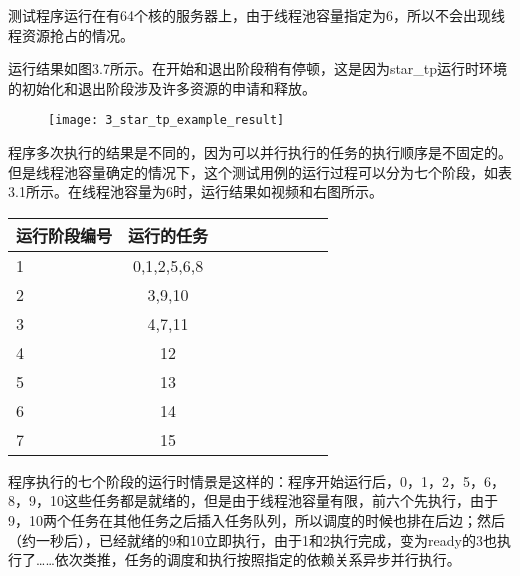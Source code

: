 测试程序运行在有64个核的服务器上，由于线程池容量指定为6，所以不会出现线程资源抢占的情况。

运行结果如图3.7所示。在开始和退出阶段稍有停顿，这是因为star\_tp运行时环境的初始化和退出阶段涉及许多资源的申请和释放。

\begin{figure}[!htbp]
    \centering
    \texttt{[image: 3\_star\_tp\_example\_result]}
    \label{fig:3_star_tp_example_result}
\end{figure}

程序多次执行的结果是不同的，因为可以并行执行的任务的执行顺序是不固定的。但是线程池容量确定的情况下，这个测试用例的运行过程可以分为七个阶段，如表3.1所示。在线程池容量为6时，运行结果如视频和右图所示。

\begin{table}[!htbp]
    \label{tab:sample}
    \centering
    \footnotesize
    \setlength{\tabcolsep}{4pt}
    \renewcommand{\arraystretch}{1.2} 
    \begin{tabular}{lcccccccc}
        \hline
        运行阶段编号 & 运行的任务 \\
        \hline
        1 & 0,1,2,5,6,8\\
        2 & 3,9,10\\
        3 & 4,7,11\\
        4 & 12\\
        5 & 13\\
        6 & 14\\
        7 & 15\\
        \hline
    \end{tabular}
\end{table}

程序执行的七个阶段的运行时情景是这样的：程序开始运行后，0，1，2，5，6，8，9，10这些任务都是就绪的，但是由于线程池容量有限，前六个先执行，由于9，10两个任务在其他任务之后插入任务队列，所以调度的时候也排在后边；然后（约一秒后），已经就绪的9和10立即执行，由于1和2执行完成，变为ready的3也执行了……依次类推，任务的调度和执行按照指定的依赖关系异步并行执行。


